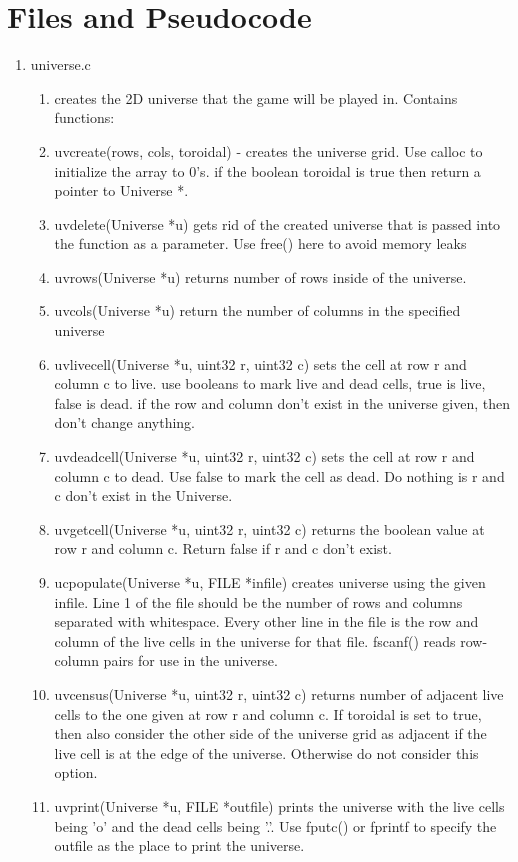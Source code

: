 \documentclass[11pt]{article}
\begin{document}
\section{Files and Pseudocode}\label{ss:files}
\begin{enumerate}
	\item universe.c
	\begin{enumerate}
		\item creates the 2D universe that the game will be played in. Contains functions:
		\item uvcreate(rows, cols, toroidal) - creates the universe grid. Use calloc to initialize the array to 0's. if the boolean toroidal is true then return a pointer to Universe *. 
		\item uvdelete(Universe *u) gets rid of the created universe that is passed into the function as a parameter. Use free() here to avoid memory leaks
		\item uvrows(Universe *u) returns number of rows inside of the universe.
		\item uvcols(Universe *u) return the number of columns in the specified universe
		\item uvlivecell(Universe *u, uint32 r, uint32 c) sets the cell at row r and column c to live. use booleans to mark live and dead cells, true is live, false is dead. if the row and column don't exist in the universe given, then don't change anything.
		\item uvdeadcell(Universe *u, uint32 r, uint32 c) sets the cell at row r and column c to dead. Use false to mark the cell as dead. Do nothing is r and c don't exist in the Universe.
		\item uvgetcell(Universe *u, uint32 r, uint32 c) returns the boolean value at row r and column c. Return false if r and c don't exist.
		\item ucpopulate(Universe *u, FILE *infile) creates universe using the given infile. Line 1 of the file should be the number of rows and columns separated with whitespace. Every other line in the file is the row and column of the live cells in the universe for that file. fscanf() reads row-column pairs for use in the universe.
		\item uvcensus(Universe *u, uint32 r, uint32 c) returns number of adjacent live cells to the one given at row r and column c. If toroidal is set to true, then also consider the other side of the universe grid as adjacent if the live cell is at the edge of the universe. Otherwise do not consider this option.
		\item uvprint(Universe *u, FILE *outfile) prints the universe with the live cells being 'o' and the dead cells being '.'. Use fputc() or fprintf to specify the outfile as the place to print the universe.

\end{enumerate}
\end{enumerate}
\end{document}
